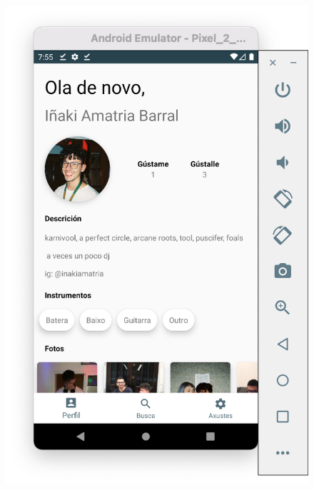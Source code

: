 \documentclass[a4paper,12pt]{article}
\begin{document}
\begin{figure}[H]
	\centering
	\includegraphics[scale=.42]{2.png}
\end{figure}
\end{document}

